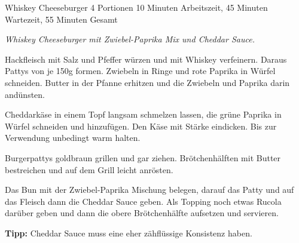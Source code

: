 \begin{recipe}{Whiskey Cheeseburger} {4 Portionen} {10 Minuten Arbeitszeit, 45 Minuten Wartezeit, 55 Minuten Gesamt}

  \freeform{}\textit{Whiskey Cheeseburger mit Zwiebel-Paprika Mix und Cheddar Sauce.}


  Hackfleisch mit Salz und Pfeffer würzen und mit Whiskey verfeinern.
  Daraus Pattys von je 150g formen.
  Zwiebeln in Ringe und rote Paprika in Würfel schneiden.
  Butter in der Pfanne erhitzen und die Zwiebeln und Paprika darin andünsten.

  \newstep{}Cheddarkäse in einem Topf langsam schmelzen lassen, die grüne Paprika in Würfel schneiden und hinzufügen.
  Den Käse mit Stärke eindicken. Bis zur Verwendung unbedingt warm halten.

  \newstep{}Burgerpattys goldbraun grillen und gar ziehen.
  Brötchenhälften mit Butter bestreichen und auf dem Grill leicht anrösten.

  \newstep{}Das Bun mit der Zwiebel-Paprika Mischung belegen, darauf das Patty und auf das Fleisch dann die Cheddar Sauce geben.
  Als Topping noch etwas Rucola darüber geben und dann die obere Brötchenhälfte aufsetzen und servieren.

  \freeform{}\hrulefill{}

  \freeform{}\textbf{Tipp:}
  Cheddar Sauce muss eine eher zähflüssige Konsistenz haben.

\end{recipe}
